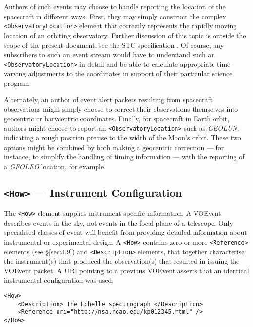 \documentclass[11pt,a4paper]{ivoa}
\begin{document}
Authors of such events may choose to handle reporting the location of the
spacecraft in different ways. First, they may simply construct the complex {\tt
<ObservatoryLocation>} element that correctly represents the rapidly moving
location of an orbiting observatory. Further discussion of this topic is outside
the scope of the present document, see the STC specification
\citep{2007ivoa.spec.1030R}. Of course, any subscribers to such an event stream
would have to understand such an {\tt <ObservatoryLocation>} in detail and be
able to calculate appropriate time-varying adjustments to the coordinates in
support of their particular science program.

Alternately, an author of event alert packets resulting from spacecraft
observations might simply choose to correct their observations themselves into
geocentric or barycentric coordinates. Finally, for spacecraft in Earth orbit,
authors might choose to report an {\tt <ObservatoryLocation>} such as
\emph{GEOLUN}, indicating a rough position precise to the width of the Moon's
orbit. These two options might be combined by both making a geocentric
correction --- for instance, to simplify the handling of timing information ---
with the reporting of a \emph{GEOLEO} location, for example.

\subsection{{\tt <How>} --- Instrument Configuration}
\label{sec:3.5}
The {\tt <How>} element supplies instrument specific information. A VOEvent
describes events in the sky, not events in the focal plane of a telescope. Only
specialised classes of event will benefit from providing detailed information
about instrumental or experimental design. A {\tt <How>} contains zero or more
{\tt <Reference>} elements (see \S\ref{sec:3.9}) and {\tt <Description>}
elements, that together characterise the instrument(s) that produced the
observation(s) that resulted in issuing the VOEvent packet. A URI pointing to a
previous VOEvent asserts that an identical instrumental configuration was used:
\begin{lstlisting}
<How>
    <Description> The Echelle spectrograph </Description>
    <Reference uri="http://nsa.noao.edu/kp012345.rtml" />
</How>
\end{lstlisting}
\end{document}
